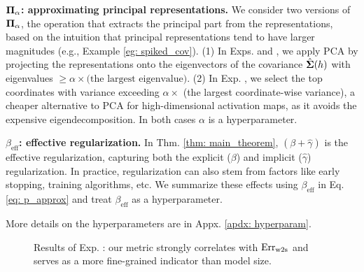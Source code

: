 \textbf{${\bm{\Pi}}_{\alpha}$: approximating principal representations.} We consider two versions of ${\bm{\Pi}}_{\alpha}$, the operation that extracts the principal part from the representations, based on the intuition that principal representations tend to have larger magnitudes {(e.g., Example \ref{eg: spiked_cov})}. (1) In Exps.  and , we apply PCA by projecting the representations onto the eigenvectors of the covariance $\hat{{\bm{\Sigma}}}(h)$ with eigenvalues $\geq \alpha \times \text{(the largest eigenvalue)}$. (2) In Exp. ,  we select the top coordinates with variance exceeding $\alpha \times$ (the largest coordinate-wise variance), a cheaper alternative to PCA for high-dimensional activation maps, as it avoids the expensive eigendecomposition. In both cases $\alpha$ is a hyperparameter. 

\textbf{$\beta_{\text{eff}}$: effective regularization.} In Thm. \ref{thm: main_theorem}, $(\beta+\hat{\gamma})$ is the effective regularization, capturing both the explicit ($\beta$) and implicit ($\hat{\gamma}$) \cite{jacot2020implicit} regularization. In practice, regularization can also stem from factors like early stopping, training algorithms, etc. We summarize these effects using $\beta_{\text{eff}}$ in Eq. \ref{eq: p_approx} and treat $\beta_{\text{eff}}$ as a hyperparameter.

More details on the hyperparameters are in Appx. \ref{apdx: hyperparam}.



\begin{figure}[!t]
\vspace{-0cm}
    \centering
{}
    \caption{ {Results of Exp. : our metric strongly correlates with $\text{Err}_{\text{w2s}}$ and serves as a more fine-grained indicator than model size.} }
    \label{fig: molecular}
    \vspace{-.2cm}
\end{figure}

